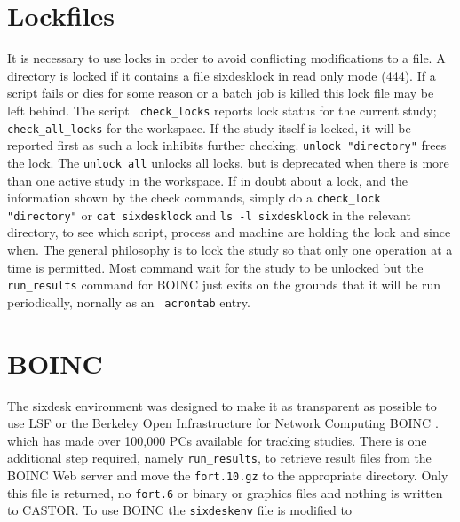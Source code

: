 \documentclass{cernatsnote}
\begin{document}
\section{Lockfiles} It is necessary to use locks in order to avoid conflicting
modifications to a file. A directory is locked if it contains a file
sixdesklock in read only mode (444).  If a script fails or dies for some reason
or a batch job is killed this lock file may be left behind. The script {\tt
check\_locks} reports lock status for the current study; {\tt
check\_all\_locks} for the workspace. If the study itself is locked, it will be
reported first as such a lock inhibits further checking.  {\tt unlock
"directory"} frees the lock. The {\tt unlock\_all} unlocks all locks, but is
deprecated when there is more than one active study in the workspace. If in
doubt about a lock, and the information shown by the check commands, simply do
a {\tt check\_lock "directory"} or {\tt cat sixdesklock} and {\tt ls -l
sixdesklock} in the relevant directory, to see which script, process and
machine are holding the lock and since when. The general philosophy is to lock
the study so that only one operation at a time is permitted. Most command wait
for the study to be unlocked but the {\tt run\_results} command for BOINC just
exits on the grounds that it will be run periodically, nornally as an {\tt
acrontab} entry.

\section{BOINC}
The sixdesk environment was designed to make it as transparent as possible to
use LSF or the 
Berkeley Open Infrastructure for Network Computing BOINC \cite{Boinc}.
which has made over 100,000 PCs available for tracking studies.
There is one additional step required, namely {\tt run\_results}, to
retrieve result files from the BOINC Web server 
and move the {\tt fort.10.gz} to the appropriate directory.
Only this file is returned, no {\tt fort.6} or binary
or graphics files and nothing is written to CASTOR.
To use BOINC the {\tt sixdeskenv} file is modified to
\end{document}

